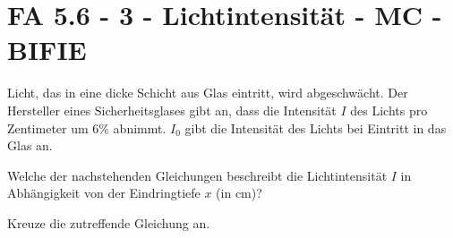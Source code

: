 \section{FA 5.6 - 3 - Lichtintensität  - MC - BIFIE}

\begin{beispiel}[FA 5.6]{1} %
Licht, das in eine dicke Schicht aus Glas eintritt, wird abgeschwächt. Der Hersteller eines Sicherheitsglases
gibt an, dass die Intensität $I$ des Lichts pro Zentimeter um 6\% abnimmt. $I_0$ gibt die Intensität des Lichts bei Eintritt in das Glas an. 

Welche der nachstehenden Gleichungen beschreibt die Lichtintensität $I$ in Abhängigkeit von der Eindringtiefe $x$ (in cm)? 

Kreuze die zutreffende Gleichung an.


\end{beispiel}